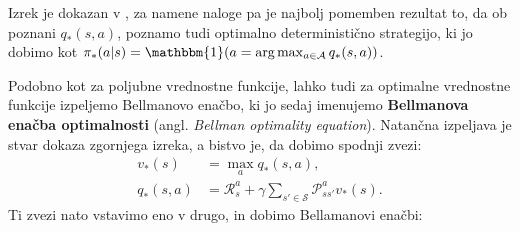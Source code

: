\documentclass[12pt,a4paper]{amsart}
\theoremstyle{definition} %
\theoremstyle{plain} %
\begin{document}
%
%

Izrek je dokazan v \cite{RLalgo}, za namene naloge pa je najbolj pomemben rezultat to, da ob poznani 
$q_*(s, a)$, poznamo tudi optimalno deterministično strategijo, ki jo dobimo kot $\pi_*(a|s) = 
\mathbbm{1} (a =\text{arg}\max_{a \in \mathcal{A}} q_*(s, a))$.

Podobno kot za poljubne vrednostne funkcije, lahko tudi za optimalne vrednostne funkcije 
izpeljemo Bellmanovo enačbo, ki jo sedaj imenujemo \textbf{Bellmanova enačba optimalnosti} (angl. 
\textit{Bellman optimality equation}). Natančna izpeljava je stvar dokaza zgornjega izreka, a bistvo je, 
da dobimo spodnji zvezi:
\begin{align*}
    v_*(s) &= \max_a q_*(s, a), \\
    q_*(s, a) &= \mathcal{R}_s^a + \gamma \sum_{s' \in \mathcal{S}} \mathcal{P}_{ss'}^a v_*(s).
\end{align*}
Ti zvezi nato vstavimo eno v drugo, in dobimo Bellamanovi enačbi: 
\end{document}
